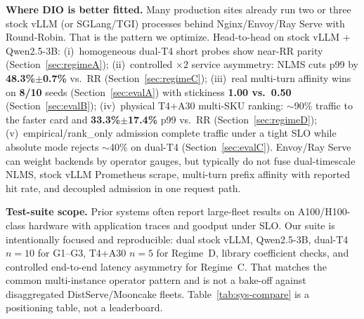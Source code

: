 \documentclass[pdflatex,sn-mathphys-num]{sn-jnl}
\begin{document}
\textbf{Where DIO is better fitted.}
Many production sites already run two or three stock vLLM (or SGLang/TGI) processes
behind Nginx/Envoy/Ray Serve with Round-Robin. That is the pattern we optimize.
Head-to-head on stock vLLM + Qwen2.5-3B: (i)~homogeneous dual-T4 short probes show
near-RR parity (Section~\ref{sec:regimeA}); (ii)~controlled $\times 2$ service
asymmetry: NLMS cuts p99 by \textbf{48.3\%$\pm$0.7\%} vs.\ RR
(Section~\ref{sec:regimeC}); (iii)~real multi-turn affinity wins on \textbf{8/10}
seeds (Section~\ref{sec:evalA}) with stickiness \textbf{1.00 vs.\ 0.50}
(Section~\ref{sec:evalB}); (iv)~physical T4$+$A30 multi-SKU ranking:
$\sim$90\% traffic to the faster card and \textbf{33.3\%$\pm$17.4\%} p99 vs.\ RR
(Section~\ref{sec:regimeD}); (v)~empirical/rank\_only admission complete traffic
under a tight SLO while absolute mode rejects $\sim$40\% on dual-T4
(Section~\ref{sec:evalC}). Envoy/Ray Serve can weight backends by operator gauges,
but typically do not fuse dual-timescale NLMS, stock vLLM Prometheus scrape,
multi-turn prefix affinity with reported hit rate, and decoupled admission in one
request path.

\textbf{Test-suite scope.}
Prior systems often report large-fleet results on A100/H100-class hardware with
application traces and goodput under SLO. Our suite is intentionally focused and
reproducible: dual stock vLLM, Qwen2.5-3B, dual-T4 $n{=}10$ for G1--G3, T4$+$A30
$n{=}5$ for Regime~D, library coefficient checks, and controlled end-to-end latency
asymmetry for Regime~C. That matches the common multi-instance operator pattern and
is not a bake-off against disaggregated DistServe/Mooncake fleets.
Table~\ref{tab:sys-compare} is a positioning table, not a leaderboard.
\end{document}
